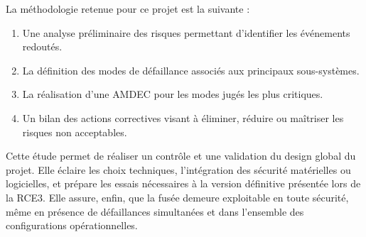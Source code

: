 La méthodologie retenue pour ce projet est la suivante :
\begin{enumerate}
    \item Une analyse préliminaire des risques permettant d’identifier les événements redoutés.
    \item La définition des modes de défaillance associés aux principaux sous-systèmes.
    \item La réalisation d’une \acrfull{AMDEC} pour les modes jugés les plus critiques.
    \item Un bilan des actions correctives visant à éliminer, réduire ou maîtriser les risques non acceptables.\\
\end{enumerate}
Cette étude permet de réaliser un contrôle et une validation du design global du projet. Elle éclaire les choix techniques,
l’intégration des sécurité matérielles ou logicielles, et prépare les essais nécessaires à la version définitive présentée lors
de la RCE3. Elle assure, enfin, que la fusée demeure exploitable en toute sécurité, même en présence de défaillances simultanées
et dans l'ensemble des configurations opérationnelles.

\newpage






\newpage
